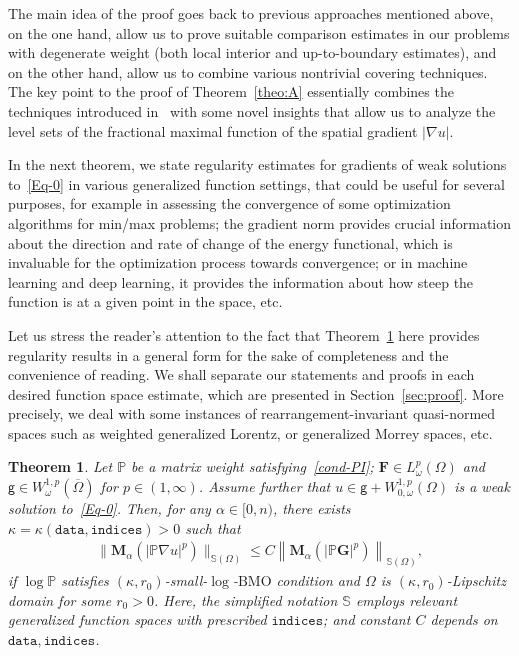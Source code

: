 \documentclass[a4paper, 11pt]{article}
\newtheorem{theorem}{Theorem}[section]
\begin{document}
The main idea of the proof goes back to previous approaches mentioned above, on the one hand, allow us to prove suitable comparison estimates in our problems with degenerate weight (both local interior and up-to-boundary estimates), and on the other hand, allow us to combine various nontrivial covering techniques. The key point to the proof of Theorem~\ref{theo:A} essentially combines the techniques introduced in~\cite{PNJFA, AM2007, BW2004} with some novel insights that allow us to analyze the level sets of the fractional maximal function of the spatial gradient $|\nabla u|$.

In the next theorem, we state regularity estimates for gradients of weak solutions to~\eqref{Eq-0} in various generalized function settings, that could be useful for several purposes, for example in assessing the convergence of some optimization algorithms for min/max problems;  the gradient norm provides crucial information about the direction and rate of change of the energy functional, which is invaluable for the optimization process towards convergence; or in machine learning and deep learning, it provides the information about how steep the function is at a given point in the space, etc. 

Let us stress the reader's attention to the fact that Theorem~\ref{theo:general} here provides regularity results in a general form for the sake of completeness and the convenience of reading. We shall separate our statements and proofs in each desired function space estimate, which are presented in Section~\ref{sec:proof}. More precisely, we deal with some instances of rearrangement-invariant quasi-normed spaces such as weighted generalized Lorentz, or generalized Morrey spaces, etc.

\begin{theorem}\label{theo:general}
Let $\mathbb{P}$ be a matrix weight satisfying~\eqref{cond-PI}; $\mathbf{F} \in L^{p}_{\omega}(\Omega)$ and $\mathsf{g} \in W^{1,p}_{\omega}(\overline{\Omega})$ for $p \in (1,\infty)$. Assume further that $u \in \mathsf{g} + W^{1,p}_{0,\omega}(\Omega)$ is a weak solution to~\eqref{Eq-0}. Then, for any $\alpha \in [0,n)$, there exists $\kappa = \kappa(\mathtt{data},\mathtt{indices})>0$ such that 
\begin{align}\label{est:B}
\|\mathbf{M}_{\alpha}(|\mathbb{P}\nabla u|^{p})\|_{\mathbb{S}(\Omega)}  \le C\left\|\mathbf{M}_{\alpha}(|\mathbb{P}\mathbf{G}|^{p})\right\|_{\mathbb{S}(\Omega)},
\end{align}
 if $\log \mathbb{P}$ satisfies $(\kappa,r_0)$-small-$\log$-$\mathrm{BMO}$ condition and $\Omega$ is $(\kappa,r_0)$-Lipschitz domain for some $r_0>0$. Here, the simplified notation $\mathbb{S}$ employs relevant generalized function spaces with prescribed $\mathtt{indices}$; and constant $C$ depends on $\mathtt{data, indices}$. \end{theorem}
\end{document}
